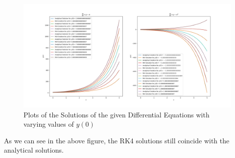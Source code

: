 \documentclass{scrartcl}
\begin{document}
\begin{figure}[h]
    \centering
    \includegraphics[width=\linewidth]{"varied_initial_vals_RK4.png"}
    \caption{Plots of the Solutions of the given Differential Equations with varying values of $y(0)$}
\end{figure}

As we can see in the above figure, the RK4 solutions still coincide with the analytical solutions.
\end{document}
